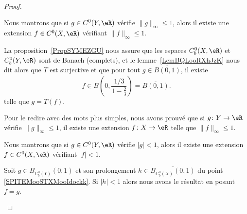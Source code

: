 \begin{proof}
\begin{subproof}
				\label{SPITEMooSTXMooIdockk}
		Nous montrons que si \(g \in C^0(Y,\eR)  \) vérifie \( \| g \|_{\infty}\leq 1\), alors il existe une extension \( f\in C^0(X,\eR)\) vérifiant \( \| f \|_{\infty}\leq 1\).

		La proposition~\ref{PropSYMEZGU} nous assure que les espaces \( C^0_b(X,\eR)\) et \( C_b^0(Y,\eR)\) sont de Banach (complets), et le lemme~\ref{LemBQLooRXhJzK} nous dit alors que \( T\) est surjective et que pour tout \( g\in\overline{ B(0,1) }\), il existe
		\begin{equation}
			f\in\overline{ B\left( 0,\frac{ 1/3 }{ 1-\frac{ 2 }{ 3 } } \right) }=\overline{ B(0,1) }.
		\end{equation}
		telle que \( g=T(f)\).

		Pour le redire avec des mots plus simples, nous avons prouvé que si \(g \colon Y\to \eR  \) vérifie \( \| g \|_{\infty}\leq 1\), il existe une extension \(f \colon X\to \eR  \) telle que \( \| f \|_{\infty}\leq 1\).

				\label{SPITEMooZBGTooKbyuch}
		Nous montrons que si \(g \in C^0(Y,\eR)  \) vérifie \( | g |< 1\), alors il existe une extension \( f\in C^0(X,\eR)\) vérifiant \( | f |<1\).

		Soit \( g\in B_{C^0_b(Y)}(0,1) \) et son prolongement \( h\in \overline{ B_{C_b^0(X)}(0,1) }\) du point \ref{SPITEMooSTXMooIdockk}. Si \( | h |<1\) alors nous avons le résultat en posant \( f=g\).


\end{subproof}
\end{proof}
